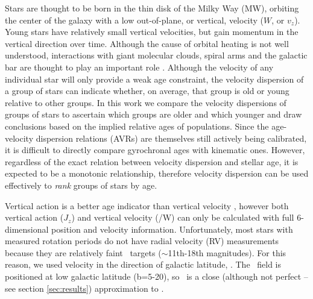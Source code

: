 Stars are thought to be born in the thin disk of the Milky Way (MW), orbiting
the center of the galaxy with a low out-of-plane, or vertical, velocity ($W$,
or $v_z$).
Young stars have relatively small vertical velocities, but gain momentum in
the vertical direction over time.
Although the cause of orbital heating is not well understood, interactions
with giant molecular clouds, spiral arms and the galactic bar are thought to
play an important role \citep[see][for a review of secular evolution in the
MW]{sellwood2014}.
Although the velocity of any individual star will only provide a weak age
constraint, the velocity dispersion of a group of stars can indicate whether,
on average, that group is old or young relative to other groups.
In this work we compare the velocity dispersions of groups of stars to
ascertain which groups are older and which younger and draw conclusions based
on the implied relative ages of populations.
Since the age-velocity dispersion relations (AVRs) are themselves still
actively being calibrated, it is difficult to directly compare gyrochronal
ages with kinematic ones.
However, regardless of the exact relation between velocity dispersion and
stellar age, it is expected to be a monotonic relationship, therefore velocity
dispersion can be used effectively to {\it rank} groups of stars by age.

Vertical action is a better age indicator than vertical velocity
\citep[although still only a weak age indicator for individual
stars,][]{beane2018}, however both vertical action ($J_z$) and vertical velocity
(\vz/W) can only be calculated with full 6-dimensional position and velocity
information.
Unfortunately, most stars with measured rotation periods do not have radial
velocity (RV) measurements because they are relatively faint \kepler\ targets
($\sim$11th-18th magnitudes).
For this reason, we used velocity in the direction of galactic latitude, \vb.
The \kepler\ field is positioned at low galactic latitude (b=5-20\degrees), so
\vb\ is a close (although not perfect -- see section \ref{sec:results})
approximation to \vz.

